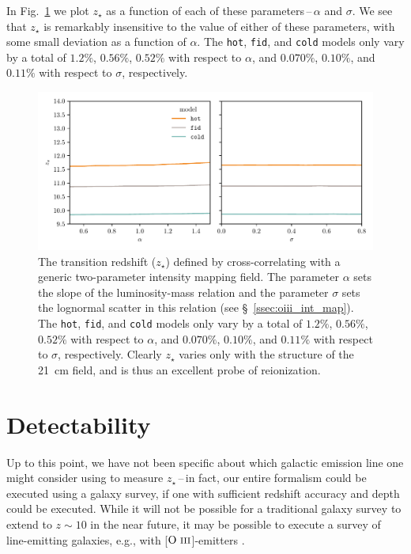 \documentclass[a4paper,fleqn,usenatbib]{mnras}
\newcommand{\OIII}{\ensuremath{\text{O~\textsc{iii}}}}
\newcommand{\fid}{\texttt{fid}}
\newcommand{\hot}{\texttt{hot}}
\newcommand{\cold}{\texttt{cold}}
\newcommand{\zst}{\ensuremath{z_{\star}}}
\begin{document}
In Fig.~\ref{fig:ztran_vs_alpha_sigma} we plot \zst{} as a function of each of
these parameters\,--\,$\alpha$ and $\sigma$. We see that \zst{} is remarkably
insensitive to the value of either of these parameters, with some small
deviation as a function of $\alpha$. The \hot{}, \fid{}, and \cold{} models
only vary by a total of $1.2\%$, $0.56\%$, $0.52\%$ with respect to $\alpha$,
and $0.070\%$, $0.10\%$, and $0.11\%$ with respect to $\sigma$, respectively.

\begin{figure}
\includegraphics[width=\textwidth]{plots/ztran_vs_alpha_sigma.pdf}
\caption{The transition redshift (\zst) defined by cross-correlating with a
generic two-parameter intensity mapping field. The parameter $\alpha$ sets the
slope of the luminosity-mass relation and the parameter $\sigma$ sets the
lognormal scatter in this relation (see \S~\ref{ssec:oiii_int_map}). The
\hot{}, \fid{}, and \cold{} models only vary by a total of $1.2\%$, $0.56\%$,
$0.52\%$ with respect to $\alpha$, and $0.070\%$, $0.10\%$, and $0.11\%$ with
respect to $\sigma$, respectively. Clearly \zst{} varies only with the
structure of the 21~cm field, and is thus an excellent probe of reionization.}
\label{fig:ztran_vs_alpha_sigma}
\end{figure}

\section{Detectability}
Up to this point, we have not been specific about which galactic emission line
one might consider using to measure \zst{}\,--\,in fact, our entire formalism
could be executed using a galaxy survey, if one with sufficient redshift
accuracy and depth could be executed. While it will not be possible for a
traditional galaxy survey to extend to $z\sim10$ in the near future, it may be
possible to execute a survey of line-emitting galaxies, e.g., with
[\OIII]-emitters \citep{2018MNRAS.481L..84M, 2019arXiv190610863M}.
\end{document}
